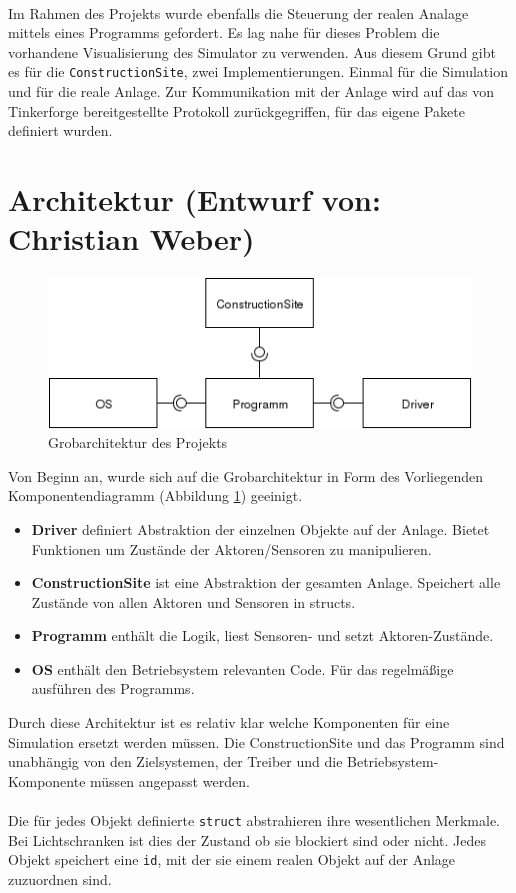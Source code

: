 \documentclass[fontsize=11pt,a4paper,final]{scrartcl}[2003/01/01]
\makeatletter
\def\ScaleIfNeeded{%
	\ifdim\Gin@nat@width>\linewidth
		\linewidth
	\else
		\Gin@nat@width
	\fi
}
\makeatother
\begin{document}
\\
Im Rahmen des Projekts wurde ebenfalls die Steuerung der realen Analage mittels eines Programms gefordert. Es lag nahe für dieses Problem die vorhandene Visualisierung des Simulator zu verwenden. Aus diesem Grund gibt es für die \lstinline|ConstructionSite|, zwei Implementierungen. Einmal für die Simulation und für die reale Anlage. Zur Kommunikation mit der Anlage wird auf das von Tinkerforge bereitgestellte Protokoll zurückgegriffen, für das eigene Pakete definiert wurden.


\section{Architektur (Entwurf von: Christian Weber)}
\label{sec:arch}

\begin{figure}[H]
	\centering
	\includegraphics[width=1\ScaleIfNeeded]{Bilder/architektur.png}
	\caption{Grobarchitektur des Projekts}
	\label{fig:Architektur}
\end{figure}
Von Beginn an, wurde sich auf die Grobarchitektur in Form des Vorliegenden Komponentendiagramm (Abbildung \ref{fig:Architektur}) geeinigt.

\begin{itemize}
 \item \textbf{Driver} definiert Abstraktion der einzelnen Objekte auf der Anlage. Bietet Funktionen um Zustände der Aktoren/Sensoren zu manipulieren.
 \item \textbf{ConstructionSite} ist eine Abstraktion der gesamten Anlage. Speichert alle Zustände von allen Aktoren und Sensoren in structs.
 \item \textbf{Programm} enthält die Logik, liest Sensoren- und setzt Aktoren-Zustände.
 \item \textbf{OS} enthält den Betriebsystem relevanten Code. Für das regelmäßige ausführen des Programms.
\end{itemize}

\noindent Durch diese Architektur ist es relativ klar welche Komponenten für eine Simulation ersetzt werden müssen. Die ConstructionSite und das Programm sind unabhängig von den Zielsystemen, der Treiber und die Betriebsystem-Komponente müssen angepasst werden.\\
\\
Die für jedes Objekt definierte \lstinline|struct| abstrahieren ihre wesentlichen Merkmale. Bei Lichtschranken ist dies der Zustand ob sie blockiert sind oder nicht. Jedes Objekt speichert eine \lstinline|id|, mit der sie einem realen Objekt auf der Anlage zuzuordnen sind.
\end{document}
